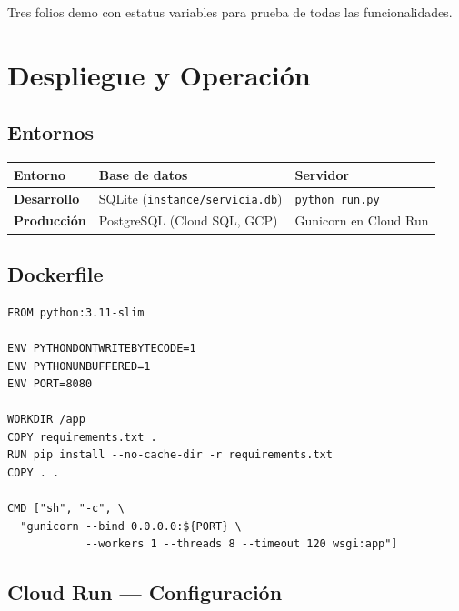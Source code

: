 \documentclass[12pt,a4paper]{article}
\begin{document}
Tres folios demo con estatus variables para prueba de todas las funcionalidades.

\newpage

\section{Despliegue y Operaci\'on}

\subsection{Entornos}

\begin{table}[h!]
\centering
\begin{tabularx}{\textwidth}{>{\bfseries}lXl}
\toprule
Entorno & Base de datos & Servidor \\
\midrule
Desarrollo & SQLite (\texttt{instance/servicia.db}) & \texttt{python run.py} \\
Producci\'on & PostgreSQL (Cloud SQL, GCP) & Gunicorn en Cloud Run \\
\bottomrule
\end{tabularx}
\end{table}

\subsection{Dockerfile}

\begin{lstlisting}[style=plain, caption={Dockerfile de producci\'on}]
FROM python:3.11-slim

ENV PYTHONDONTWRITEBYTECODE=1
ENV PYTHONUNBUFFERED=1
ENV PORT=8080

WORKDIR /app
COPY requirements.txt .
RUN pip install --no-cache-dir -r requirements.txt
COPY . .

CMD ["sh", "-c", \
  "gunicorn --bind 0.0.0.0:${PORT} \
            --workers 1 --threads 8 --timeout 120 wsgi:app"]
\end{lstlisting}

\subsection{Cloud Run --- Configuraci\'on}
\end{document}
